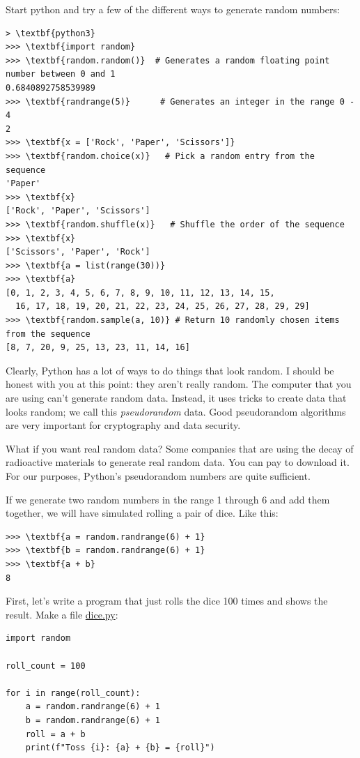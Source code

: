 Start python and try a few of the different ways to generate random numbers:
\begin{Verbatim}[commandchars=\\\{\}]
> \textbf{python3}
>>> \textbf{import random}
>>> \textbf{random.random()}  # Generates a random floating point number between 0 and 1
0.6840892758539989
>>> \textbf{randrange(5)}      # Generates an integer in the range 0 - 4
2
>>> \textbf{x = ['Rock', 'Paper', 'Scissors']}
>>> \textbf{random.choice(x)}   # Pick a random entry from the sequence
'Paper'
>>> \textbf{x}
['Rock', 'Paper', 'Scissors'] 
>>> \textbf{random.shuffle(x)}   # Shuffle the order of the sequence
>>> \textbf{x}
['Scissors', 'Paper', 'Rock']
>>> \textbf{a = list(range(30))}
>>> \textbf{a}
[0, 1, 2, 3, 4, 5, 6, 7, 8, 9, 10, 11, 12, 13, 14, 15,
  16, 17, 18, 19, 20, 21, 22, 23, 24, 25, 26, 27, 28, 29, 29]
>>> \textbf{random.sample(a, 10)} # Return 10 randomly chosen items from the sequence
[8, 7, 20, 9, 25, 13, 23, 11, 14, 16]
\end{Verbatim}
Clearly, Python has a lot of ways to do things that look random. I
should be honest with you at this point: they aren't really
random. The computer that you are using can't generate random
data. Instead, it uses tricks to create data that looks random; we
call this \textit{pseudorandom} data. Good pseudorandom algorithms are
very important for cryptography and data security.

What if you want real random data? Some companies that are using
the decay of radioactive materials to generate real random data. You
can pay to download it. For our purposes, Python's pseudorandom
numbers are quite sufficient.

If we generate two random numbers in the range 1 through 6 and add them together, we
will have simulated rolling a pair of dice. Like this:

\begin{Verbatim}[commandchars=\\\{\}]
>>> \textbf{a = random.randrange(6) + 1}
>>> \textbf{b = random.randrange(6) + 1}
>>> \textbf{a + b}
8
\end{Verbatim}

First, let's write a program that just rolls the dice 100 times and shows the result. Make a file \url{dice.py}:
\begin{Verbatim}
import random

roll_count = 100

for i in range(roll_count):
    a = random.randrange(6) + 1
    b = random.randrange(6) + 1
    roll = a + b
    print(f"Toss {i}: {a} + {b} = {roll}")
\end{Verbatim}

